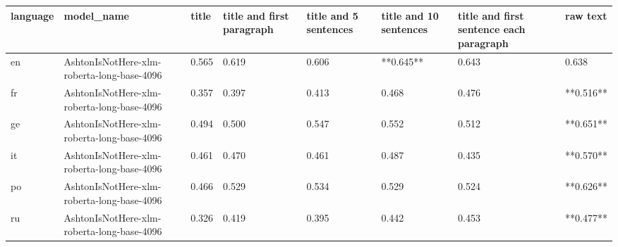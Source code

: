 \begin{tabular}{llllllll}
\toprule
language &                                 model\_name & title & title and first paragraph & title and 5 sentences & title and 10 sentences & title and first sentence each paragraph &  raw text \\
\midrule
      en & AshtonIsNotHere-xlm-roberta-long-base-4096 & 0.565 &                     0.619 &                 0.606 &              **0.645** &                                   0.643 &     0.638 \\
      fr & AshtonIsNotHere-xlm-roberta-long-base-4096 & 0.357 &                     0.397 &                 0.413 &                  0.468 &                                   0.476 & **0.516** \\
      ge & AshtonIsNotHere-xlm-roberta-long-base-4096 & 0.494 &                     0.500 &                 0.547 &                  0.552 &                                   0.512 & **0.651** \\
      it & AshtonIsNotHere-xlm-roberta-long-base-4096 & 0.461 &                     0.470 &                 0.461 &                  0.487 &                                   0.435 & **0.570** \\
      po & AshtonIsNotHere-xlm-roberta-long-base-4096 & 0.466 &                     0.529 &                 0.534 &                  0.529 &                                   0.524 & **0.626** \\
      ru & AshtonIsNotHere-xlm-roberta-long-base-4096 & 0.326 &                     0.419 &                 0.395 &                  0.442 &                                   0.453 & **0.477** \\
\bottomrule
\end{tabular}
